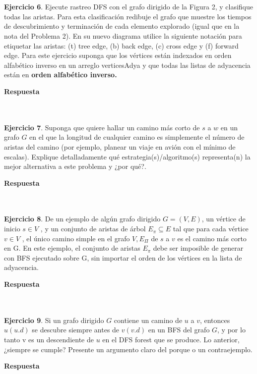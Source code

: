 \documentclass[12pt]{article}
\begin{document}
\par\ \\\ \\\noindent
\textbf{Ejercicio 6}. Ejecute rastreo DFS con el grafo dirigido de la Figura 2, y clasifique todas las aristas. Para esta clasificación redibuje el grafo que muestre los tiempos de descubrimiento y terminación de cada elemento explorado (igual que en la nota del Problema 2). En su nuevo diagrama utilice la siguiente notación para etiquetar las aristas: (t) tree edge, (b)
back edge, (c) cross edge y (f) forward edge. Para este ejercicio suponga que los vértices
están indexados en orden alfabético inverso en un arreglo verticesAdya y que todas las listas
de adyacencia están en {\Large\bf orden alfabético inverso.}

\par \textbf{Respuesta}






\par\ \\\ \\\noindent
\textbf{Ejercicio 7}. Suponga que quiere hallar un camino más corto de $s$ a $w$ en un grafo $G$ en el que la longitud de cualquier camino es simplemente el número de aristas del camino (por ejemplo, planear un viaje en avión con el m\'inimo de escalas). Explique detalladamente qué estrategia(s)/algoritmo(s) representa(n) la mejor alternativa a este problema y ¿por qué?.

\par \textbf{Respuesta}






\par\ \\\ \\\noindent
\textbf{Ejercicio 8}. De un ejemplo de algún grafo dirigido $G = (V, E)$, un vértice de inicio $s \in V$ , y un conjunto de aristas de árbol $E_\pi \subseteq E$ tal que para cada vértice $v \in V$ , el único camino simple en el grafo $V, E_\Pi$ de $s$ a $v$ es el camino más corto en G. En este ejemplo, el conjunto de aristas $E_\pi$ debe ser imposible de generar con BFS ejecutado sobre G, sin importar el orden de los vértices en la lista de adyacencia.

\par \textbf{Respuesta}






\par\ \\\ \\\noindent
\textbf{Ejercicio 9}. Si un grafo dirigido $G$ contiene un camino de $u$ a $v$, entonces $u (u.d)$ se descubre siempre antes de $v (v.d)$ en un BFS del grafo $G$, y por lo tanto v es un descendiente de $u$ en el DFS forest que se produce. Lo anterior, ¿siempre se cumple? Presente un argumento claro del porque o un contraejemplo. 

\par \textbf{Respuesta}
\end{document}
